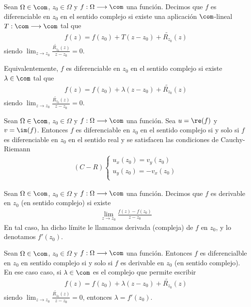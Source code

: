 \begin{defi}
Sean $\Omega \in \com$, $z_0 \in \Omega$ y $f : \Omega \longrightarrow \com$ una función. Decimos que $f$ es diferenciable en $z_0$ en el sentido complejo si existe una aplicación $\com$-lineal $T : \com \longrightarrow \com$ tal que
\begin{align*}
    f(z) = f(z_0) + T(z - z_0) +\widetilde{R_{z_0}}(z)
\end{align*}
siendo $\lim_{z \to z_0}{\frac{\widetilde{R_{z_0}}(z)}{z - z_0} = 0}$.
\end{defi}
Equivalentemente, $f$ es diferenciable en $z_0$ en el sentido complejo si existe $\lambda \in \com$ tal que
\begin{align*}
    f(z) = f(z_0) + \lambda (z - z_0) + \widetilde{R_{z_0}}(z)
\end{align*}
siendo $\lim_{z \to z_0}{\frac{\widetilde{R_{z_0}}(z)}{z - z_0} = 0}$.

\begin{prop}
Sean $\Omega \in \com$, $z_0 \in \Omega$ y $f : \Omega \longrightarrow \com$ una función. Sea $u = \re(f)$ y $v = \im(f)$. Entonces $f$ es diferenciable en $z_0$ en el sentido complejo si y solo si $f$ es diferenciable en $z_0$ en el sentido real y se satisfacen las condiciones de Cauchy-Riemann
\begin{align*}
    (C-R) \left\{ \begin{array}{lcc}
            u_x(z_0) = v_y(z_0) \\
            u_y(z_0) = -v_x(z_0)\\
             \end{array}
        \right.
\end{align*}
\end{prop}

\begin{defi}
Sean $\Omega \in \com$, $z_0 \in \Omega$ y $f : \Omega \longrightarrow \com$ una función. Decimos que $f$ es derivable en $z_0$ (en sentido complejo) si existe
\begin{align*}
    \lim_{z \to z_0}{\frac{f(z) - f(z_0)}{z - z_0}}
\end{align*}
En tal caso, ha dicho límite le llamamos derivada (compleja) de $f$ en $z_0$, y lo denotamos $f'(z_0)$.
\end{defi}

\begin{prop}
Sean $\Omega \in \com$, $z_0 \in \Omega$ y $f : \Omega \longrightarrow \com$ una función. Entonces $f$ es diferencialble en $z_0$ en sentido complejo si y solo si $f$ es derivable en $z_0$ (en sentido complejo). En ese caso caso, si $\lambda \in \com$ es el complejo que permite escribir
\begin{align*}
    f(z) = f(z_0) + \lambda (z - z_0) + \widetilde{R_{z_0}}(z)
\end{align*}
siendo $\lim_{z \to z_0}{\frac{\widetilde{R_{z_0}}(z)}{z - z_0} = 0}$, entonces $\lambda = f'(z_0)$.
\end{prop}


